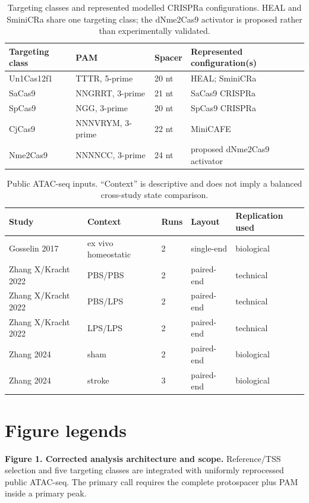 \documentclass[11pt]{article}
\begin{document}



\clearpage
\begin{table}[p]
\centering
\caption{Targeting classes and represented modelled CRISPRa configurations. HEAL and SminiCRa share one targeting class; the dNme2Cas9 activator is proposed rather than experimentally validated.}
\label{tab:classes}
\small
\begin{tabular}{llll}
\toprule
Targeting class & PAM & Spacer & Represented configuration(s) \\
\midrule
Un1Cas12f1 & TTTR, 5-prime & 20 nt & HEAL; SminiCRa \\
SaCas9 & NNGRRT, 3-prime & 21 nt & SaCas9 CRISPRa \\
SpCas9 & NGG, 3-prime & 20 nt & SpCas9 CRISPRa \\
CjCas9 & NNNVRYM, 3-prime & 22 nt & MiniCAFE \\
Nme2Cas9 & NNNNCC, 3-prime & 24 nt & proposed dNme2Cas9 activator \\
\bottomrule
\end{tabular}
\end{table}

\begin{table}[p]
\centering
\caption{Public ATAC-seq inputs. ``Context'' is descriptive and does not imply a balanced cross-study state comparison.}
\label{tab:inputs}
\small
\begin{tabular}{lllll}
\toprule
Study & Context & Runs & Layout & Replication used \\
\midrule
Gosselin 2017 & ex vivo homeostatic & 2 & single-end & biological \\
Zhang X/Kracht 2022 & PBS/PBS & 2 & paired-end & technical \\
Zhang X/Kracht 2022 & PBS/LPS & 2 & paired-end & technical \\
Zhang X/Kracht 2022 & LPS/LPS & 2 & paired-end & technical \\
Zhang 2024 & sham & 2 & paired-end & biological \\
Zhang 2024 & stroke & 3 & paired-end & biological \\
\bottomrule
\end{tabular}
\end{table}

\section*{Figure legends}

\textbf{Figure 1. Corrected analysis architecture and scope.} Reference/TSS selection and five targeting classes are integrated with uniformly reprocessed public ATAC-seq. The primary call requires the complete protospacer plus PAM inside a primary peak.
\end{document}
